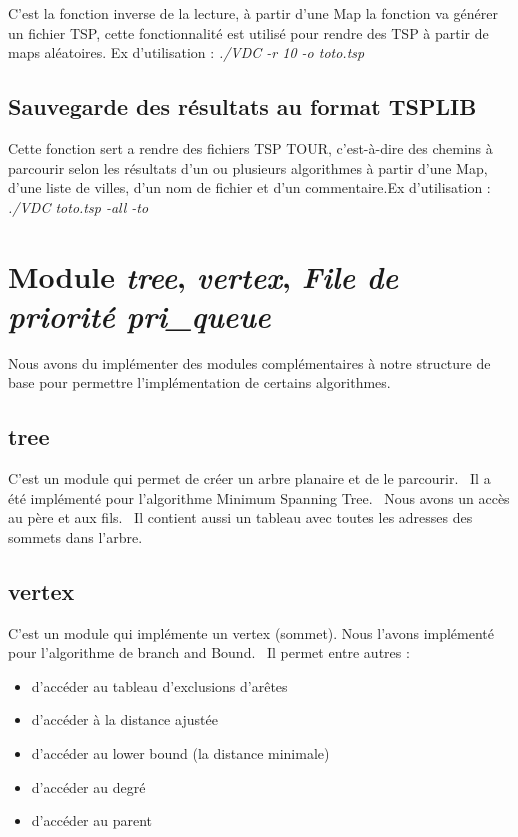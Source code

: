 \documentclass[12pt]{report}
\begin{document}
{{{{{{{C'est la fonction inverse de la lecture, à partir d'une Map la fonction va générer un fichier TSP, cette fonctionnalité est utilisé pour rendre des TSP à partir de maps aléatoires. Ex d'utilisation : \textit{./VDC -r 10 -o toto.tsp}

\subsection{Sauvegarde des résultats au format TSPLIB}

Cette fonction sert a rendre des fichiers TSP TOUR, c'est-à-dire des chemins à parcourir selon les résultats d'un ou plusieurs algorithmes à partir d'une Map, d'une liste de villes, d'un nom de fichier et d'un commentaire.Ex d'utilisation : \textit{./VDC toto.tsp -all -to}


\section{Module \textit{tree}, \textit{vertex}, \textit{File de priorité \textit{pri\_queue}}}

Nous avons du implémenter des modules complémentaires à notre structure de base pour permettre l'implémentation de certains algorithmes.

\subsection{tree}

C'est un module qui permet de créer un arbre planaire et de le parcourir. \
Il a été implémenté pour l'algorithme Minimum Spanning Tree. \
Nous avons un accès au père et aux fils. \
Il contient aussi un tableau avec toutes les adresses des sommets dans l'arbre. \

\subsection{vertex}

C'est un module qui implémente un vertex (sommet). Nous l'avons implémenté pour l'algorithme de branch and Bound. \
Il permet entre autres : 
\begin{itemize}
\item d'accéder au tableau d'exclusions d'arêtes
\item d'accéder à la distance ajustée
\item d'accéder au lower bound (la distance minimale)
\item d'accéder au degré
\item d'accéder au parent
\end{itemize}

}}}}}}}
\end{document}
